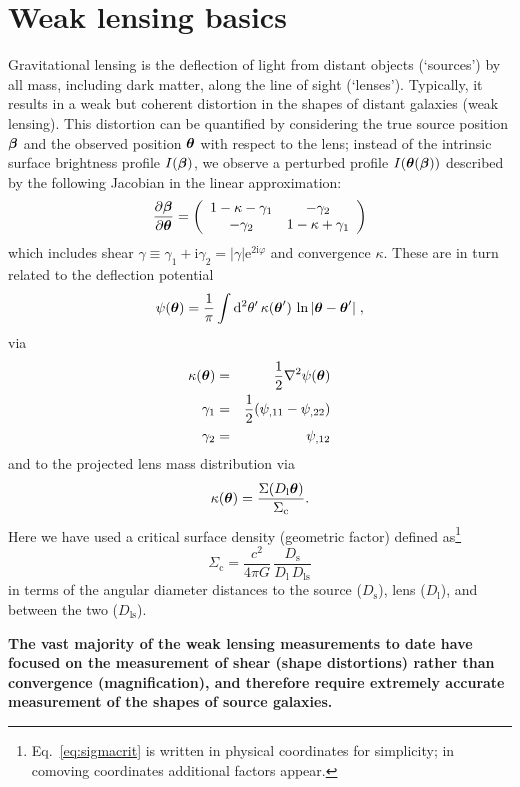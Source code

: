 \documentclass[twocolumn,useAMS,usenatbib]{mn2e}
\newcommand{\beq}{\begin{equation}}
\newcommand{\eeq}{\end{equation}}
\newcommand{\beqa}{\begin{eqnarray}}
\newcommand{\eeqa}{\end{eqnarray}}
\newcommand{\rmd}{\mathrm{d}}
\newcommand{\newtext}{}
\newcommand{\reftext}[1]{\textbf{#1}}
\begin{document}
\section{Weak lensing basics}\label{S:lensing}

Gravitational lensing is the deflection of light from distant objects
(`sources') by all mass, including dark matter, along the line of
sight (`lenses').  Typically, it results in a weak but coherent
distortion in the shapes of distant galaxies (weak lensing).  This
distortion can be quantified by considering the true source position
${\bmath \beta}$ and the observed position ${\bmath \theta}$ with respect to
the lens; instead of the intrinsic surface brightness profile
$I({\bmath \beta})$, we observe a perturbed profile
$I({\bmath \theta}({\bmath \beta}))$ described by the following Jacobian in
the linear approximation:
\beq\label{E:jacobian}
 \frac{\partial{\bmath \beta}}{\partial{\bmath \theta}} = \left(
    \begin{array}{cc}
      1-\kappa-\gamma_1 & -\gamma_2 \\ 
      -\gamma_2 & 1-\kappa+\gamma_1 \\
    \end{array}
  \right)
\eeq
which includes shear $\gamma\equiv\gamma_1+\mathrm{i}\gamma_2 =
|\gamma|\mathrm{e}^{2\mathrm{i}\varphi}$ and convergence $\kappa$.
These are in turn related to the deflection potential
\beq
  \psi({\bmath \theta}) = \frac{1}{\pi}\int\rmd^2\theta'\,
  \kappa({\bmath \theta'})\,\ln|{\bmath \theta}-{\bmath \theta'}|\;,
\eeq
via
\beqa
\kappa({\bmath \theta})&=&\frac{1}{2}\nabla^2\psi({\bmath \theta}) \nonumber \\
 \gamma_1 &=& \frac{1}{2}(\psi_{,11}-\psi_{,22}) \nonumber \\
  \gamma_2 &=& \psi_{,12}
\eeqa
and to the projected lens mass distribution via 
\beq
  \kappa({\bmath \theta}) = 
  \frac{\Sigma(D_\mathrm{l}{\bmath \theta})}{\Sigma_\mathrm{c}}.
\eeq
Here we have used a critical surface density (geometric factor) defined as\footnote{\newtext{Eq.~\eqref{eq:sigmacrit} is written in physical coordinates for simplicity; in comoving coordinates additional 
factors appear.}}
\beq
  \Sigma_\mathrm{c} = \frac{c^2}{4\pi G}\,
  \frac{D_\mathrm{s}}{D_\mathrm{l}\,D_\mathrm{ls}}
\label{eq:sigmacrit}
\eeq
in terms of the angular diameter distances to the source
($D_\mathrm{s}$), lens ($D_\mathrm{l}$), and between the two
($D_\mathrm{ls}$). 

\reftext{The vast majority of the weak lensing
  measurements to date have focused on the measurement of shear (shape
  distortions) rather than convergence (magnification), and therefore
  require extremely accurate measurement of the shapes of source galaxies.}
\end{document}
